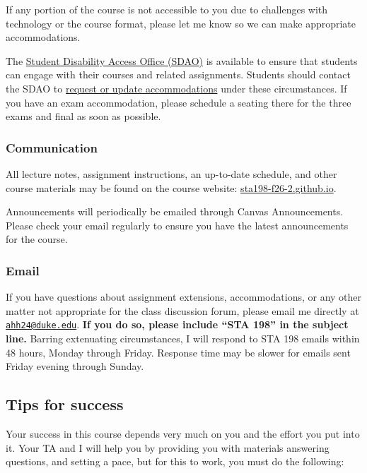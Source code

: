 \documentclass[
  letterpaper,
  DIV=11,
  numbers=noendperiod]{scrartcl}
\begin{document}
If any portion of the course is not accessible to you due to challenges
with technology or the course format, please let me know so we can make
appropriate accommodations.

The \href{https://access.duke.edu/students}{Student Disability Access
Office (SDAO)} is available to ensure that students can engage with
their courses and related assignments. Students should contact the SDAO
to \href{https://access.duke.edu/requests}{request or update
accommodations} under these circumstances. If you have an exam
accommodation, please schedule a seating there for the three exams and
final as soon as possible.

\subsubsection{Communication}\label{communication}

All lecture notes, assignment instructions, an up-to-date schedule, and
other course materials may be found on the course website:
\href{https://sta198-f26-2.github.io/}{sta198-f26-2.github.io}.

Announcements will periodically be emailed through Canvas Announcements.
Please check your email regularly to ensure you have the latest
announcements for the course.

\subsubsection{Email}\label{email}

If you have questions about assignment extensions, accommodations, or
any other matter not appropriate for the class discussion forum, please
email me directly at
\href{mailto:ahh24@duke.edu}{\nolinkurl{ahh24@duke.edu}}. \textbf{If you
do so, please include ``STA 198'' in the subject line.} Barring
extenuating circumstances, I will respond to STA 198 emails within 48
hours, Monday through Friday. Response time may be slower for emails
sent Friday evening through Sunday.

\subsection{Tips for success}\label{tips-for-success}

Your success in this course depends very much on you and the effort you
put into it. Your TA and I will help you by providing you with materials
answering questions, and setting a pace, but for this to work, you must
do the following:
\end{document}
